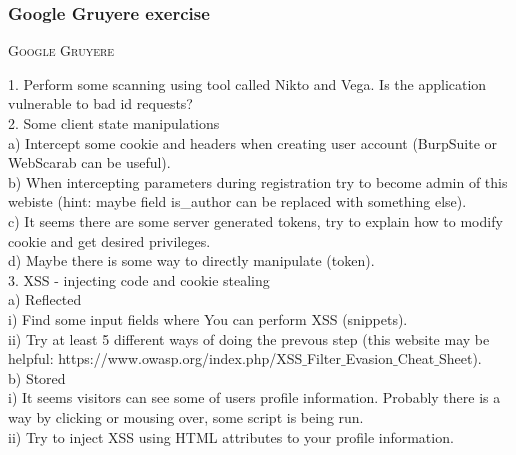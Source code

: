 \documentclass[12pt, a4paper]{article}
\begin{document}
\newpage{}

\subsubsection{Google Gruyere exercise}
		\begin{center} \textsc{Google Gruyere}
		\end{center}
	
	1. Perform some scanning using tool called Nikto and Vega. Is the application vulnerable to bad id requests?\\
	
	2. Some client state manipulations\\
	
	a) Intercept some cookie and headers when creating user account (BurpSuite or WebScarab can be useful).\\
	
	b) When intercepting parameters during registration try to become admin of this webiste (hint: maybe field is\_author can be replaced with something else).\\
	
	c) It seems there are some server generated tokens, try to explain how to modify cookie and get desired privileges.\\
	
	d) Maybe there is some way to directly manipulate (token).\\
	
	3. XSS - injecting code and cookie stealing\\
	
	a) Reflected\\
	
	i) Find some input fields where You can perform XSS (snippets).\\
	
	ii) Try at least 5 different ways of doing the prevous step (this website may be helpful: https://www.owasp.org/index.php/XSS$\_$Filter$\_$Evasion$\_$Cheat$\_$Sheet).\\
	
	b) Stored\\
	
	i) It seems visitors can see some of users profile information. Probably there is a way by clicking or mousing over, some script is being run.\\
	
	ii) Try to inject XSS using HTML attributes to your profile information.\\
	
\end{document}
